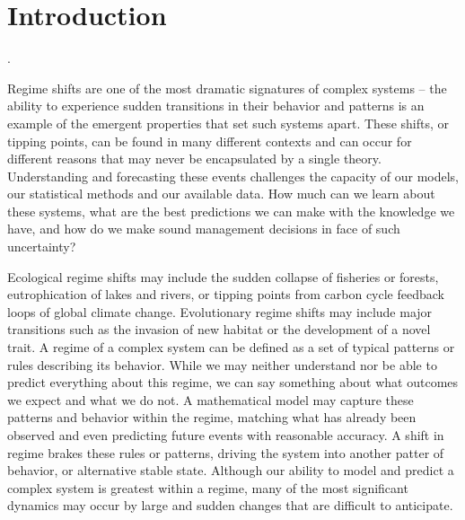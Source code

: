 
\chapter{Introduction}\label{Introduction}.  


Regime shifts are one of the most dramatic signatures of complex systems – the ability to experience sudden transitions in their behavior and patterns is an example of the emergent properties that set such systems apart. These shifts, or tipping points, can be found in many different contexts and can occur for different reasons that may never be encapsulated by a single theory.   Understanding and forecasting these events challenges the capacity of our models, our statistical methods and our available data.  How much can we learn about these systems, what are the best predictions we can make with the knowledge we have, and how do we make sound management decisions in face of such uncertainty?  

Ecological regime shifts may include the sudden collapse of fisheries or forests, eutrophication of lakes and rivers, or tipping points from carbon cycle feedback loops of global climate change.  Evolutionary regime shifts may include major transitions such as the invasion of new habitat or the development of a novel trait.  A regime of a complex system can be defined as a set of typical patterns or rules describing its behavior.  While we may neither understand nor be able to predict everything about this regime, we can say something about what outcomes we expect and what we do not.   A mathematical model may capture these patterns and behavior within the regime, matching what has already been observed and even predicting future events with reasonable accuracy.  A shift in regime brakes these rules or patterns, driving the system into another patter of behavior, or alternative stable state.  Although our ability to model and predict a complex system is greatest within a regime, many of the most significant dynamics may occur by large and sudden changes that are difficult to anticipate.  


